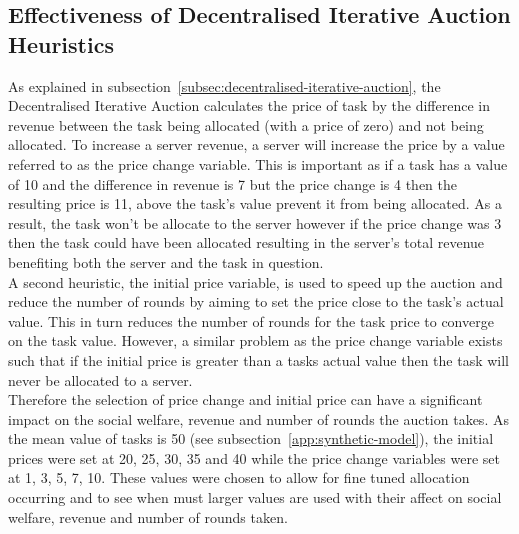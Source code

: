 \subsection{Effectiveness of Decentralised Iterative Auction Heuristics}
\label{subsec:effectiveness-of-decentralised-iterative-auction-heuristics}
As explained in subsection~\ref{subsec:decentralised-iterative-auction}, the Decentralised Iterative Auction
calculates the price of task by the difference in revenue between the task being allocated (with a price of
zero) and not being allocated. To increase a server revenue, a server will increase the price by a value referred to as
the price change variable. This is important as if a task has a value of 10 and the difference in revenue is 7 but the
price change is 4 then the resulting price is 11, above the task's value prevent it from being allocated. As a result,
the task won't be allocate to the server however if the price change was 3 then the task could have been allocated
resulting in the server's total revenue benefiting both the server and the task in question. \\
A second heuristic, the initial price variable, is used to speed up the auction and reduce the number of rounds by
aiming to set the price close to the task's actual value. This in turn reduces the number of rounds for the task price
to converge on the task value. However, a similar problem as the price change variable exists such that if the initial
price is greater than a tasks actual value then the task will never be allocated to a server. \\
Therefore the selection of price change and initial price can have a significant impact on the social welfare, revenue
and number of rounds the auction takes. As the mean value of tasks is 50 (see subsection~\ref{app:synthetic-model}),
the initial prices were set at 20, 25, 30, 35 and 40 while the price change variables were set at 1, 3, 5, 7, 10. These
values were chosen to allow for fine tuned allocation occurring and to see when must larger values are used with their
affect on social welfare, revenue and number of rounds taken.

